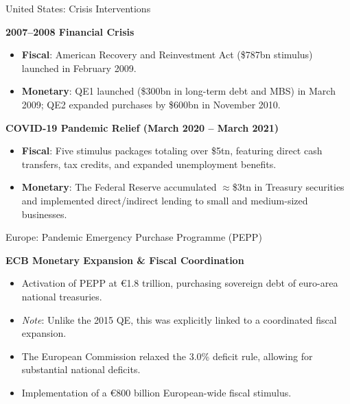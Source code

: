 \documentclass[11pt,aspectratio=169]{beamer}
\begin{document}
\begin{frame}{United States: Crisis Interventions}
\small

\textbf{2007--2008 Financial Crisis}
\begin{itemize}
    \item \textbf{Fiscal}: American Recovery and Reinvestment Act (\$787bn stimulus) launched in February 2009.
    \item \textbf{Monetary}: QE1 launched (\$300bn in long-term debt and MBS) in March 2009; QE2 expanded purchases by \$600bn in November 2010.
\end{itemize}

\vspace{0.2cm}

\textbf{COVID-19 Pandemic Relief (March 2020 -- March 2021)}
\begin{itemize}
    \item \textbf{Fiscal}: Five stimulus packages totaling over \$5tn, featuring direct cash transfers, tax credits, and expanded unemployment benefits.
    \item \textbf{Monetary}: The Federal Reserve accumulated $\approx$\$3tn in Treasury securities and implemented direct/indirect lending to small and medium-sized businesses.
\end{itemize}

\end{frame}

\begin{frame}{Europe: Pandemic Emergency Purchase Programme (PEPP)}
\small

\textbf{ECB Monetary Expansion \& Fiscal Coordination}
\begin{itemize}
    \item Activation of PEPP at €1.8 trillion, purchasing sovereign debt of euro-area national treasuries.
    \item \textit{Note}: Unlike the 2015 QE, this was explicitly linked to a coordinated fiscal expansion.
    \item The European Commission relaxed the 3.0\% deficit rule, allowing for substantial national deficits.
    \item Implementation of a €800 billion European-wide fiscal stimulus.
\end{itemize}

\end{frame}
\end{document}
